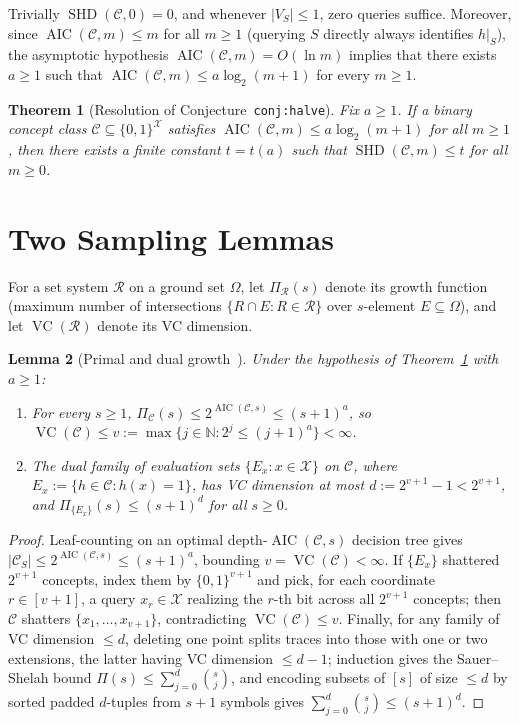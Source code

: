 \documentclass[11pt]{article}
\theoremstyle{plain}
\newtheorem{theorem}{Theorem}
\newtheorem{lemma}[theorem]{Lemma}
\theoremstyle{definition}
\theoremstyle{remark}
\DeclareMathOperator{\AIC}{AIC}
\DeclareMathOperator{\SHD}{SHD}
\DeclareMathOperator{\VC}{VC}
\begin{document}
Trivially $\SHD(\mathcal{C}, 0) = 0$, and whenever $|V_S| \le 1$, zero queries suffice. Moreover, since $\AIC(\mathcal{C}, m) \le m$ for all $m \ge 1$ (querying $S$ directly always identifies $h|_S$), the asymptotic hypothesis $\AIC(\mathcal{C}, m) = O(\ln m)$ implies that there exists $a \ge 1$ such that $\AIC(\mathcal{C}, m) \le a\log_2(m+1)$ for every $m \ge 1$.

\begin{theorem}[Resolution of Conjecture~\texttt{conj:halve}]\label{thm:main}
Fix $a \ge 1$. If a binary concept class $\mathcal{C} \subseteq \{0,1\}^{\mathcal{X}}$ satisfies $\AIC(\mathcal{C}, m) \le a\log_2(m+1)$ for all $m \ge 1$, then there exists a finite constant $t = t(a)$ such that $\SHD(\mathcal{C}, m) \le t$ for all $m \ge 0$.
\end{theorem}

\section{Two Sampling Lemmas}

For a set system $\mathcal{R}$ on a ground set $\Omega$, let $\Pi_{\mathcal{R}}(s)$ denote its growth function (maximum number of intersections $\{R \cap E : R \in \mathcal{R}\}$ over $s$-element $E \subseteq \Omega$), and let $\VC(\mathcal{R})$ denote its VC dimension.

\begin{lemma}[Primal and dual growth~\cite{Assouad1983,Sauer1972,Shelah1972}]\label{lem:growth}
Under the hypothesis of Theorem~\ref{thm:main} with $a \ge 1$:
\begin{enumerate}[label=\textup{(\arabic*)}]
\item For every $s \ge 1$, $\Pi_{\mathcal{C}}(s) \le 2^{\AIC(\mathcal{C},s)} \le (s+1)^a$, so $\VC(\mathcal{C}) \le v := \max\{j \in \mathbb{N} : 2^j \le (j+1)^a\} < \infty$.
\item The dual family of evaluation sets $\{E_x : x \in \mathcal{X}\}$ on $\mathcal{C}$, where $E_x := \{h \in \mathcal{C} : h(x) = 1\}$, has VC dimension at most $d := 2^{v+1} - 1 < 2^{v+1}$, and $\Pi_{\{E_x\}}(s) \le (s+1)^d$ for all $s \ge 0$.
\end{enumerate}
\end{lemma}

\begin{proof}
Leaf-counting on an optimal depth-$\AIC(\mathcal{C},s)$ decision tree gives $|\mathcal{C}_S| \le 2^{\AIC(\mathcal{C},s)} \le (s+1)^a$, bounding $v = \VC(\mathcal{C}) < \infty$. If $\{E_x\}$ shattered $2^{v+1}$ concepts, index them by $\{0,1\}^{v+1}$ and pick, for each coordinate $r \in [v+1]$, a query $x_r \in \mathcal{X}$ realizing the $r$-th bit across all $2^{v+1}$ concepts; then $\mathcal{C}$ shatters $\{x_1,\dots,x_{v+1}\}$, contradicting $\VC(\mathcal{C}) \le v$. Finally, for any family of VC dimension $\le d$, deleting one point splits traces into those with one or two extensions, the latter having VC dimension $\le d-1$; induction gives the Sauer--Shelah bound $\Pi(s) \le \sum_{j=0}^d \binom{s}{j}$, and encoding subsets of $[s]$ of size $\le d$ by sorted padded $d$-tuples from $s+1$ symbols gives $\sum_{j=0}^d \binom{s}{j} \le (s+1)^d$.
\end{proof}
\end{document}
